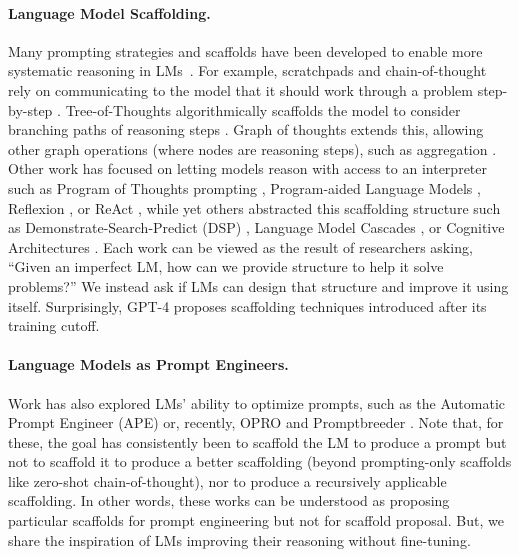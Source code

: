 \documentclass{article}
\begin{document}
\paragraph{Language Model Scaffolding.}
Many prompting strategies and scaffolds have been developed to enable more systematic reasoning in LMs~\citep{wei_chain_2022,yao2022react,yao2023tree,zelikman2022parsel,chen2022program,zhou2022least,khattab2022demonstrate,jiang2022draft,sel2023algorithm,besta2023graph,poesia2023certified}. For example, scratchpads and chain-of-thought rely on communicating to the model that it should work through a problem step-by-step \citep{nye2021show,wei_chain_2022}. Tree-of-Thoughts algorithmically scaffolds the model to consider branching paths of reasoning steps \citep{yao2023tree}. Graph of thoughts extends this, allowing other graph operations (where nodes are reasoning steps), such as aggregation \citep{besta2023graph}. Other work has focused on letting models reason with access to an interpreter such as Program of Thoughts prompting \citep{chen2022program}, Program-aided Language Models \citep{gao2023pal}, Reflexion \citep{shinn2023reflexion}, or ReAct \citep{yao2022react}, while yet others abstracted this scaffolding structure such as Demonstrate-Search-Predict (DSP) \citep{khattab2022demonstrate}, Language Model Cascades \citep{dohan2022language}, or Cognitive Architectures \citep{sumers2023cognitive}. Each work can be viewed as the result of researchers asking, ``Given an imperfect LM, how can we provide structure to help it solve problems?'' We instead ask if LMs can design that structure and improve it using itself. Surprisingly, GPT-4 proposes scaffolding techniques introduced after its training cutoff.

\paragraph{Language Models as Prompt Engineers.}

Work has also explored LMs' ability to optimize prompts, such as the Automatic Prompt Engineer (APE) \citep{zhou2022large} or, recently, OPRO \citep{yang2023large} and Promptbreeder \citep{fernando2023promptbreeder}. Note that, for these, the goal has consistently been to scaffold the LM to produce a prompt but not to scaffold it to produce a better scaffolding (beyond prompting-only scaffolds like zero-shot chain-of-thought), nor to produce a recursively applicable scaffolding. In other words, these works can be understood as proposing particular scaffolds for prompt engineering but not for scaffold proposal. But, we share the inspiration of LMs improving their reasoning without fine-tuning.\vspace{-1px}
 
\end{document}
